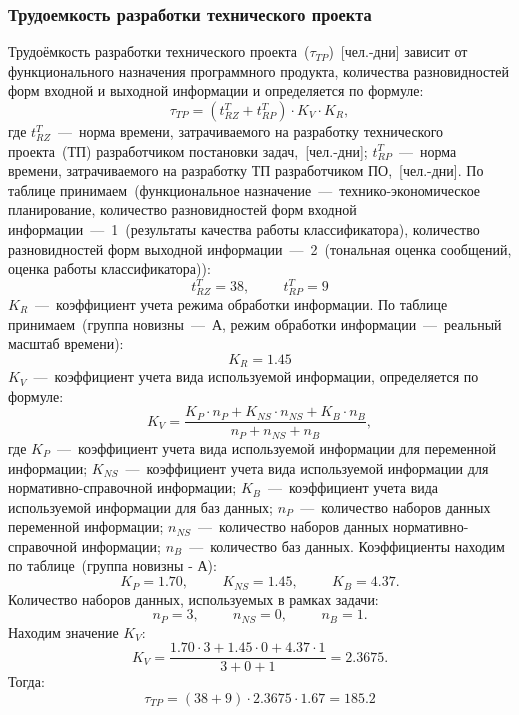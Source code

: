         \subsubsection{Трудоемкость разработки технического проекта}
            Трудоёмкость разработки технического проекта~($\tau_{TP}$)~[чел.-дни]
            зависит от функционального назначения программного продукта, количества
            разновидностей форм входной и выходной информации и определяется по формуле:
            $$\tau_{TP} = (t^T_{RZ} + t^T_{RP})\cdot K_V\cdot K_R,$$
            где $t^T_{RZ}$~---~норма времени, затрачиваемого на разработку технического проекта~(ТП) разработчиком постановки задач,~[чел.-дни];
            $t^T_{RP}$~---~норма времени, затрачиваемого на разработку ТП разработчиком ПО,~[чел.-дни].
            По таблице принимаем~(функциональное назначение~---~технико-экономическое планирование,
            количество разновидностей форм входной информации~---~1~(результаты качества работы классификатора),
            количество разновидностей форм выходной информации~---~2~(тональная оценка сообщений, оценка работы классификатора)):
            $$t^T_{RZ} = 38, \hspace{1cm} t^T_{RP} = 9$$
            $K_R$~---~коэффициент учета режима обработки информации. По таблице принимаем~(группа новизны~---~А, режим обработки информации~---~реальный масштаб времени):
            $$K_R = 1.45$$
            $K_V$~---~коэффициент учета вида используемой информации, определяется по формуле:
            $$K_V = \dfrac {K_P\cdot n_P + K_{NS}\cdot n_{NS} + K_B\cdot n_B} {n_P + n_{NS} + n_B },$$
            где $K_P$~---~коэффициент учета вида используемой информации для переменной информации;
            $K_{NS}$~---~коэффициент учета вида используемой информации для нормативно-справочной информации;
            $K_B$~---~коэффициент учета вида используемой информации для баз данных;
            $n_P$~---~количество наборов данных переменной информации;
            $n_{NS}$~---~количество наборов данных нормативно-справочной информации;
            $n_B$~---~количество баз данных.
            Коэффициенты находим по таблице~(группа новизны - А):
            $$K_P=1.70, \hspace{1cm} K_{NS}=1.45, \hspace{1cm} K_B=4.37.$$
            Количество наборов данных, используемых в рамках задачи:
            $$n_P=3, \hspace{1cm} n_{NS}=0, \hspace{1cm} n_B=1.$$
            Находим значение $K_V$:
            $$K_V = \dfrac{1.70\cdot 3+1.45\cdot 0+4.37\cdot 1}{3+0+1}=2.3675.$$
            Тогда:
            $$\tau_{TP} = (38+9)\cdot 2.3675\cdot 1.67 = 185.2$$

